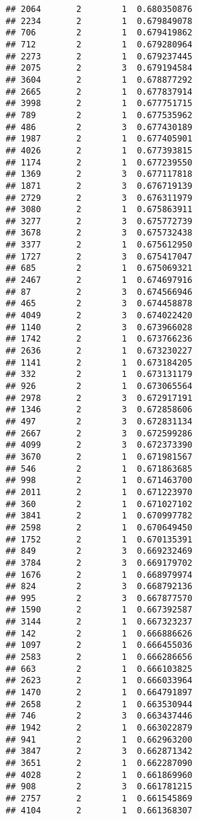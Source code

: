 \documentclass[
]{article}
\begin{document}
\begin{verbatim}
## 2064       2        1  0.680350876
## 2234       2        1  0.679849078
## 706        2        1  0.679419862
## 712        2        1  0.679280964
## 2273       2        1  0.679237445
## 2075       2        3  0.679194584
## 3604       2        1  0.678877292
## 2665       2        1  0.677837914
## 3998       2        1  0.677751715
## 789        2        1  0.677535962
## 486        2        3  0.677430189
## 1987       2        1  0.677405901
## 4026       2        1  0.677393815
## 1174       2        1  0.677239550
## 1369       2        3  0.677117818
## 1871       2        3  0.676719139
## 2729       2        3  0.676311979
## 3080       2        1  0.675863911
## 3277       2        3  0.675772739
## 3678       2        3  0.675732438
## 3377       2        1  0.675612950
## 1727       2        3  0.675417047
## 685        2        1  0.675069321
## 2467       2        1  0.674697916
## 87         2        3  0.674566946
## 465        2        3  0.674458878
## 4049       2        3  0.674022420
## 1140       2        3  0.673966028
## 1742       2        1  0.673766236
## 2636       2        1  0.673230227
## 1141       2        1  0.673184205
## 332        2        1  0.673131179
## 926        2        1  0.673065564
## 2978       2        3  0.672917191
## 1346       2        3  0.672858606
## 497        2        3  0.672831134
## 2667       2        3  0.672599286
## 4099       2        3  0.672373390
## 3670       2        1  0.671981567
## 546        2        1  0.671863685
## 998        2        1  0.671463700
## 2011       2        1  0.671223970
## 360        2        1  0.671027102
## 3841       2        1  0.670997782
## 2598       2        1  0.670649450
## 1752       2        1  0.670135391
## 849        2        3  0.669232469
## 3784       2        3  0.669179702
## 1676       2        1  0.668979974
## 824        2        3  0.668792136
## 995        2        3  0.667877570
## 1590       2        1  0.667392587
## 3144       2        1  0.667323237
## 142        2        1  0.666886626
## 1097       2        1  0.666455036
## 2583       2        1  0.666286656
## 663        2        1  0.666103825
## 2623       2        1  0.666033964
## 1470       2        1  0.664791897
## 2658       2        1  0.663530944
## 746        2        3  0.663437446
## 1942       2        1  0.663022879
## 941        2        1  0.662963200
## 3847       2        3  0.662871342
## 3651       2        1  0.662287090
## 4028       2        1  0.661869960
## 908        2        3  0.661781215
## 2757       2        1  0.661545869
## 4104       2        1  0.661368307

\end{verbatim}
\end{document}
